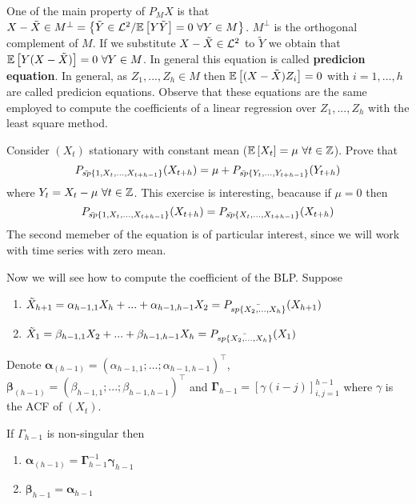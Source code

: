 One of the main property of $P_MX$ is that $X-\tilde{X}\in M^\perp=\left\{\tilde{Y}\in\mathcal{L}^{2}/\mathbb{E}\left[Y\tilde{Y}\right]=0\ \forall Y\in M\right\}$. $M^\perp$ is the orthogonal complement of $M$. If we substitute $X-\tilde{X}\in\mathcal{L}^{2}$ to $\tilde{Y}$ we obtain that $\expect{Y(X-\tilde{X})}=0\ \forall Y\in M$. In general this equation is called \textbf{predicion equation}. In general, as $Z_1,...,Z_h\in M$ then $\mathbb{E}\left[(X-\tilde{X})Z_i\right]=0$ with $i=1,...,h$ are called predicion equations. Observe that these equations are the same employed to compute the coefficients of a linear regression over $Z_1,...,Z_h$ with the least square method.

\begin{exercise}
    Consider $(X_t)$ stationary with constant mean ($\mathbb{E}\left[X_t\right]=\mu\ \forall t\in\mathbb{Z}$). Prove that
    \[
        P_{\bar{sp}\left\{1,X_t,...,X_{t+h-1}\right\}}(X_{t+h})=\mu+P_{\bar{sp}\left\{Y_t,...,Y_{t+h-1}\right\}}(Y_{t+h})  
    \]
    where $Y_t=X_t-\mu\ \forall t\in\mathbb{Z}$. This exercise is interesting, beacause if $\mu=0$ then
    \[
        P_{\bar{sp}\left\{1,X_t,...,X_{t+h-1}\right\}}(X_{t+h})=P_{\bar{sp}\left\{X_t,...,X_{t+h-1}\right\}}(X_{t+h})  
    \]
    The second memeber of the equation is of particular interest, since we will work with time series with zero mean.
\end{exercise}

Now we will see how to compute the coefficient of the BLP. Suppose
\begin{enumerate}
    \item $\tilde{X}_{h+1}=\alpha_{h-1,1}X_h+...+\alpha_{h-1,h-1}X_2=P_{\bar{sp\left\{X_2,...,X_h\right\}}}(X_{h+1})$
    \item $\tilde{X}_1=\beta_{h-1,1}X_2+...+\beta_{h-1,h-1}X_h=P_{\bar{sp\left\{X_2,...,X_h\right\}}}(X_1)$
\end{enumerate}
Denote $\boldsymbol{\alpha}_{(h-1)}=(\alpha_{h-1,1};...;\alpha_{h-1,h-1})^\intercal$, $\boldsymbol{\beta}_{(h-1)}=(\beta_{h-1,1};...;\beta_{h-1,h-1})^\intercal$ and $\boldsymbol{\Gamma}_{h-1}=\left[\gamma(i-j)\right]_{i,j=1}^{h-1}$ where $\gamma$ is the ACF of $(X_t)$.

\begin{proposition}
    If $\Gamma_{h-1}$ is non-singular then
    \begin{enumerate}
        \item $\boldsymbol{\alpha}_{(h-1)}=\boldsymbol{\Gamma}_{h-1}^{-1}\boldsymbol{\gamma}_{h-1}$
        \item $\boldsymbol{\beta}_{h-1}=\boldsymbol{\alpha}_{h-1}$
    \end{enumerate} 
\end{proposition}


